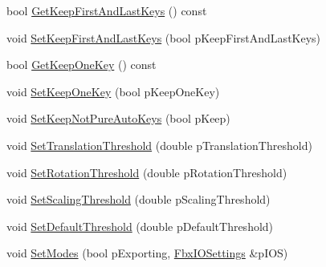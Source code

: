 \begin{DoxyCompactItemize}
\item 
bool \hyperlink{class_fbx_anim_curve_filter_constant_key_reducer_acb96f386ab154175fff45e7fdcbbfb3f}{Get\+Keep\+First\+And\+Last\+Keys} () const
\item 
void \hyperlink{class_fbx_anim_curve_filter_constant_key_reducer_a8833a42ff21debd38098de294ea9cbd2}{Set\+Keep\+First\+And\+Last\+Keys} (bool p\+Keep\+First\+And\+Last\+Keys)
\item 
bool \hyperlink{class_fbx_anim_curve_filter_constant_key_reducer_a098b50fec08965071f8eb5aec3a02e78}{Get\+Keep\+One\+Key} () const
\item 
void \hyperlink{class_fbx_anim_curve_filter_constant_key_reducer_ad71523fadea43a9532d600040b37a865}{Set\+Keep\+One\+Key} (bool p\+Keep\+One\+Key)
\item 
void \hyperlink{class_fbx_anim_curve_filter_constant_key_reducer_ae233ca614a39edb0e496f0dbc510f0ae}{Set\+Keep\+Not\+Pure\+Auto\+Keys} (bool p\+Keep)
\item 
void \hyperlink{class_fbx_anim_curve_filter_constant_key_reducer_acc31edd257d4b94cc91a899b7d45deb2}{Set\+Translation\+Threshold} (double p\+Translation\+Threshold)
\item 
void \hyperlink{class_fbx_anim_curve_filter_constant_key_reducer_a60e81af3f1d41764a42a9ddea89acb97}{Set\+Rotation\+Threshold} (double p\+Rotation\+Threshold)
\item 
void \hyperlink{class_fbx_anim_curve_filter_constant_key_reducer_af15fcce7deb4c02ea677fb3612fb368c}{Set\+Scaling\+Threshold} (double p\+Scaling\+Threshold)
\item 
void \hyperlink{class_fbx_anim_curve_filter_constant_key_reducer_ab2bd860bc4704e2f0945f58a66b040d6}{Set\+Default\+Threshold} (double p\+Default\+Threshold)
\item 
void \hyperlink{class_fbx_anim_curve_filter_constant_key_reducer_aa0d5c478c267b58cd0de9cedb9f931dd}{Set\+Modes} (bool p\+Exporting, \hyperlink{class_fbx_i_o_settings}{Fbx\+I\+O\+Settings} \&p\+I\+OS)
\end{DoxyCompactItemize}
